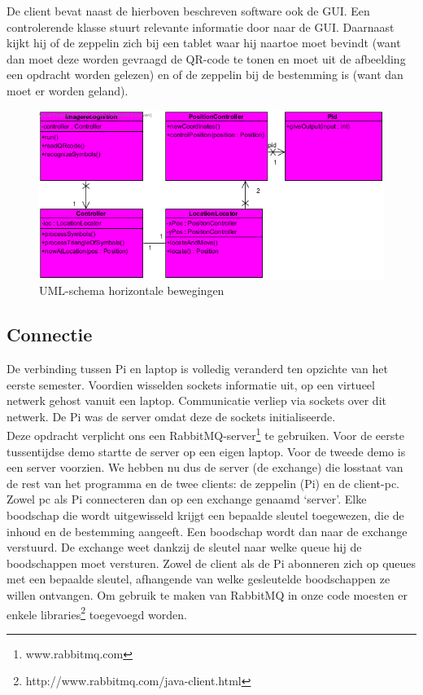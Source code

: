 \documentclass[eind]{penoverslag}
\begin{document}
De client bevat naast de hierboven beschreven software ook de GUI. Een controlerende klasse stuurt relevante informatie door naar de GUI. Daarnaast kijkt hij of de zeppelin zich bij een tablet waar hij naartoe moet bevindt (want dan moet deze worden gevraagd de QR-code te tonen en moet uit de afbeelding een opdracht worden gelezen) en of de zeppelin bij de bestemming is (want dan moet er worden geland).\\

\begin{figure}[H]
\begin{center}
\includegraphics[width=\textwidth]{classdiagrampeno.png}
\end{center}
\caption{UML-schema horizontale bewegingen}
\label{navigation}
\end{figure}

\subsection{Connectie}
De verbinding tussen Pi en laptop is volledig veranderd ten opzichte van het eerste semester. Voordien wisselden sockets informatie uit, op een virtueel netwerk gehost vanuit een laptop. Communicatie verliep via sockets over dit netwerk. De Pi was de server omdat deze de sockets initialiseerde.\\
Deze opdracht verplicht ons een RabbitMQ-server\footnote{www.rabbitmq.com} te gebruiken. Voor de eerste tussentijdse demo startte de server op een eigen laptop. Voor de tweede demo is een server voorzien. We hebben nu dus de server (de exchange) die losstaat van de rest van het programma en de twee clients: de zeppelin (Pi) en de client-pc. Zowel pc als Pi connecteren dan op een exchange genaamd ‘server’. Elke boodschap die wordt uitgewisseld krijgt een bepaalde sleutel toegewezen, die de inhoud en de bestemming aangeeft. Een boodschap wordt dan naar de exchange verstuurd. De exchange weet dankzij de sleutel naar welke queue hij de boodschappen moet versturen. Zowel de client als de Pi abonneren zich op queues met een bepaalde sleutel, afhangende van welke gesleutelde boodschappen ze willen ontvangen. Om gebruik te maken van RabbitMQ in onze code moesten er enkele libraries\footnote{http://www.rabbitmq.com/java-client.html} toegevoegd worden. \\
\end{document}
